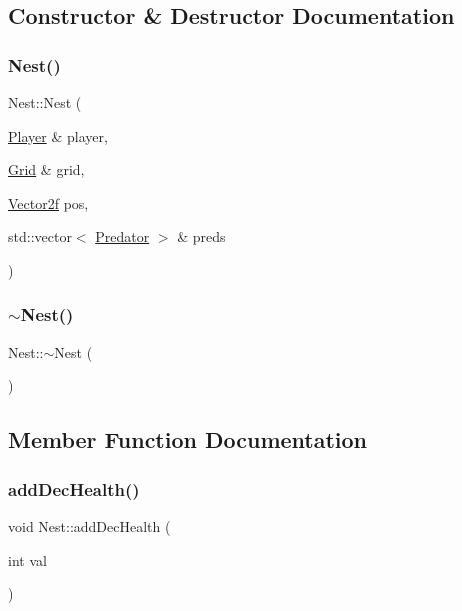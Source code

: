 \subsection{Constructor \& Destructor Documentation}
\mbox{\label{class_nest_ab6ee6871ff8b0cd03443ae5c4925f3a6}} 
\subsubsection{\texorpdfstring{Nest()}{Nest()}}
{\footnotesize\ttfamily Nest\+::\+Nest (\begin{DoxyParamCaption}\item[{\mbox{\hyperlink{class_player}{Player}} \&}]{player,  }\item[{\mbox{\hyperlink{class_grid}{Grid}} \&}]{grid,  }\item[{\mbox{\hyperlink{class_vector2f}{Vector2f}}}]{pos,  }\item[{std\+::vector$<$ \mbox{\hyperlink{class_predator}{Predator}} $>$ \&}]{preds }\end{DoxyParamCaption})}

\mbox{\label{class_nest_a3e879ba15acd31717b1dc9bdc87488d5}} 
\subsubsection{\texorpdfstring{$\sim$Nest()}{~Nest()}}
{\footnotesize\ttfamily Nest\+::$\sim$\+Nest (\begin{DoxyParamCaption}{ }\end{DoxyParamCaption})}



\subsection{Member Function Documentation}
\mbox{\label{class_nest_aa27374891443c16bf480b1cda4edf2aa}} 
\subsubsection{\texorpdfstring{addDecHealth()}{addDecHealth()}}
{\footnotesize\ttfamily void Nest\+::add\+Dec\+Health (\begin{DoxyParamCaption}\item[{int}]{val }\end{DoxyParamCaption})}

